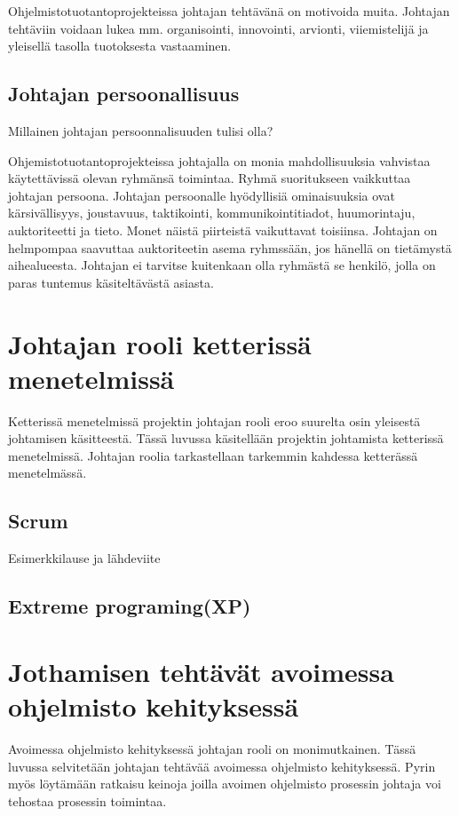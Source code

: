 \documentclass[finnish]{tktltiki2}
\theoremstyle{definition}
\theoremstyle{remark}
\begin{document}
Ohjelmistotuotantoprojekteissa johtajan tehtävänä on motivoida muita. Johtajan tehtäviin voidaan lukea mm. organisointi, innovointi, arvionti, viiemistelijä  ja yleisellä tasolla tuotoksesta vastaaminen. ~\cite{4017705}

\subsection{Johtajan persoonallisuus}

Millainen johtajan persoonnalisuuden tulisi olla?

Ohjemistotuotantoprojekteissa johtajalla on monia mahdollisuuksia vahvistaa käytettävissä olevan ryhmänsä toimintaa. Ryhmä suoritukseen vaikkuttaa johtajan persoona. Johtajan persoonalle hyödyllisiä ominaisuuksia ovat kärsivällisyys, joustavuus, taktikointi, kommunikointitiadot, huumorintaju, auktoriteetti ja tieto. Monet näistä piirteistä vaikuttavat toisiinsa. Johtajan on helmpompaa saavuttaa auktoriteetin asema ryhmssään, jos hänellä on tietämystä aihealueesta. Johtajan ei tarvitse kuitenkaan olla ryhmästä se henkilö, jolla on paras tuntemus käsiteltävästä asiasta.~\cite{4017705} 

\section{Johtajan rooli ketterissä menetelmissä}

Ketterissä menetelmissä projektin johtajan rooli eroo suurelta osin yleisestä johtamisen käsitteestä. Tässä luvussa käsitellään projektin johtamista ketterissä menetelmissä. Johtajan roolia tarkastellaan tarkemmin kahdessa ketterässä menetelmässä. 

\subsection{Scrum}
Esimerkkilause ja lähdeviite~\cite{4755768}

\subsection{Extreme programing(XP)}

\section{Jothamisen tehtävät avoimessa ohjelmisto kehityksessä}

Avoimessa ohjelmisto kehityksessä johtajan rooli on monimutkainen. Tässä luvussa selvitetään johtajan tehtävää avoimessa ohjelmisto kehityksessä. Pyrin myös löytämään ratkaisu keinoja joilla avoimen ohjelmisto prosessin johtaja voi tehostaa prosessin toimintaa.
\end{document}
